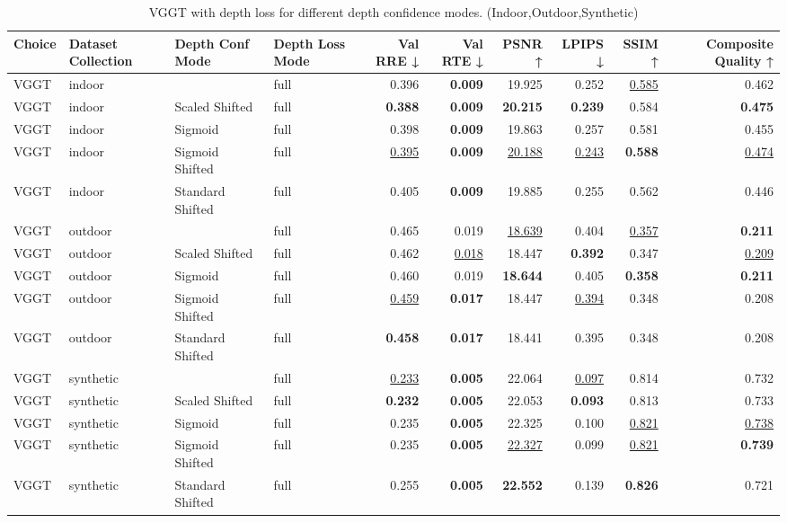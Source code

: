 \begin{table}[H]
\caption{\ifdefined\customcaption \customcaption \else VGGT with depth loss for different depth confidence modes. (Indoor,Outdoor,Synthetic) \fi}
\label{tab:05_depth_conf_mode_brief_indoor,outdoor,synthetic}
\centering
\scriptsize
\begin{tabular}{llllrrrrrr}
\toprule
Choice & Dataset Collection & Depth Conf Mode & Depth Loss Mode & Val RRE ↓ & Val RTE ↓ & PSNR ↑ & LPIPS ↓ & SSIM ↑ & Composite Quality ↑ \\
\midrule
VGGT & indoor &  & full & 0.396 & \textbf{0.009} & 19.925 & 0.252 & \underline{0.585} & 0.462 \\
VGGT & indoor & Scaled Shifted & full & \textbf{0.388} & \textbf{0.009} & \textbf{20.215} & \textbf{0.239} & 0.584 & \textbf{0.475} \\
VGGT & indoor & Sigmoid & full & 0.398 & \textbf{0.009} & 19.863 & 0.257 & 0.581 & 0.455 \\
VGGT & indoor & Sigmoid Shifted & full & \underline{0.395} & \textbf{0.009} & \underline{20.188} & \underline{0.243} & \textbf{0.588} & \underline{0.474} \\
VGGT & indoor & Standard Shifted & full & 0.405 & \textbf{0.009} & 19.885 & 0.255 & 0.562 & 0.446 \\
\midrule
VGGT & outdoor &  & full & 0.465 & 0.019 & \underline{18.639} & 0.404 & \underline{0.357} & \textbf{0.211} \\
VGGT & outdoor & Scaled Shifted & full & 0.462 & \underline{0.018} & 18.447 & \textbf{0.392} & 0.347 & \underline{0.209} \\
VGGT & outdoor & Sigmoid & full & 0.460 & 0.019 & \textbf{18.644} & 0.405 & \textbf{0.358} & \textbf{0.211} \\
VGGT & outdoor & Sigmoid Shifted & full & \underline{0.459} & \textbf{0.017} & 18.447 & \underline{0.394} & 0.348 & 0.208 \\
VGGT & outdoor & Standard Shifted & full & \textbf{0.458} & \textbf{0.017} & 18.441 & 0.395 & 0.348 & 0.208 \\
\midrule
VGGT & synthetic &  & full & \underline{0.233} & \textbf{0.005} & 22.064 & \underline{0.097} & 0.814 & 0.732 \\
VGGT & synthetic & Scaled Shifted & full & \textbf{0.232} & \textbf{0.005} & 22.053 & \textbf{0.093} & 0.813 & 0.733 \\
VGGT & synthetic & Sigmoid & full & 0.235 & \textbf{0.005} & 22.325 & 0.100 & \underline{0.821} & \underline{0.738} \\
VGGT & synthetic & Sigmoid Shifted & full & 0.235 & \textbf{0.005} & \underline{22.327} & 0.099 & \underline{0.821} & \textbf{0.739} \\
VGGT & synthetic & Standard Shifted & full & 0.255 & \textbf{0.005} & \textbf{22.552} & 0.139 & \textbf{0.826} & 0.721 \\
\bottomrule
\end{tabular}
\end{table}